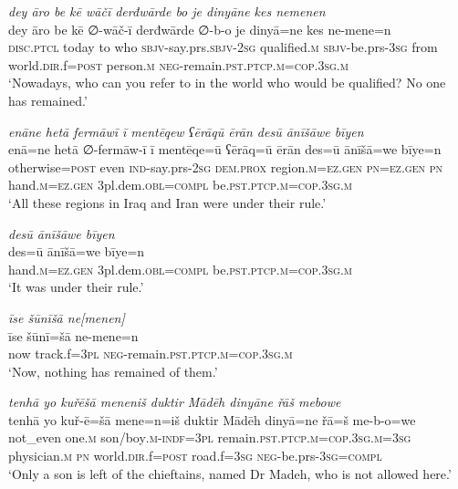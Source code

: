 \ea \label{ŠJ.101}
\textit{dey āro be kē wāčī derđwārde bo je dinyāne kes nemenen} \\ 
\gll dey āro be kē ∅-wāč-ī derđwārde ∅-b-o je dinyā=ne kes ne-mene=n \\ 
 \textsc{disc.ptcl} today to who \textsc{sbjv-}say.prs.\textsc{sbjv-}\textsc{2sg} qualified\textsc{.m} \textsc{sbjv-}be.prs\textsc{-3sg} from world\textsc{.dir}.f\textsc{=\textsc{post}} person\textsc{.m} \textsc{neg-}remain\textsc{.pst}\textsc{.ptcp}\textsc{.m}\textsc{=cop}\textsc{.3sg}\textsc{.m} \\ 
\glt `Nowadays, who can you refer to in the world who would be qualified? No one has remained.'
\z 
 
\ea \label{ŠJ.102}
\textit{enāne hetā fermāwī ī mentēqew ʕērāqū ērān desū ānīšāwe bīyen} \\ 
\gll enā=ne hetā ∅-fermāw-ī ī mentēqe=ū ʕērāq=ū ērān des=ū ānīšā=we bīye=n \\ 
 otherwise\textsc{=\textsc{post}} even \textsc{ind-}say.prs-\textsc{2sg} \textsc{dem.prox} region\textsc{.m}\textsc{=ez.gen} \textsc{pn}\textsc{=ez.gen} \textsc{pn} hand\textsc{.m}\textsc{=ez.gen} 3pl.dem\textsc{.obl}\textsc{=compl} be\textsc{.pst}\textsc{.ptcp}\textsc{.m}\textsc{=cop}\textsc{.3sg}\textsc{.m} \\ 
\glt `All these regions in Iraq and Iran were under their rule.'
\z 
 
\ea \label{ŠJ.103}
\textit{desū ānīšāwe bīyen} \\ 
\gll des=ū ānīšā=we bīye=n \\ 
 hand\textsc{.m}\textsc{=ez.gen} 3pl.dem\textsc{.obl}\textsc{=compl} be\textsc{.pst}\textsc{.ptcp}\textsc{.m}\textsc{=cop}\textsc{.3sg}\textsc{.m} \\ 
\glt `It was under their rule.'
\z 
 
\ea \label{ŠJ.104}
\textit{īse šūnīšā ne[menen]} \\ 
\gll īse šūnī=šā ne-mene=n \\ 
 now track.f\textsc{=3pl} \textsc{neg-}remain\textsc{.pst}\textsc{.ptcp}\textsc{.m}\textsc{=cop}\textsc{.3sg}\textsc{.m} \\ 
\glt `Now, nothing has remained of them.'
\z 
 
\ea \label{ŠJ.105}
\textit{tenhā yo kuřēšā meneniš duktir Mādēh dinyāne řāš mebowe} \\ 
\gll tenhā yo kuř-ē=šā mene=n=iš duktir Mādēh dinyā=ne řā=š me-b-o=we \\ 
 not\_even one\textsc{.m} son/boy\textsc{.m}\textsc{-indf}\textsc{=3pl} remain\textsc{.pst}\textsc{.ptcp}\textsc{.m}\textsc{=cop}\textsc{.3sg}\textsc{.m}\textsc{=3sg} physician\textsc{.m} \textsc{pn} world\textsc{.dir}.f\textsc{=\textsc{post}} road.f\textsc{=3sg} \textsc{neg-}be.prs\textsc{-3sg}\textsc{=compl} \\ 
\glt `Only a son is left of the chieftains, named Dr Madeh, who is not allowed here.'
\z 
 
